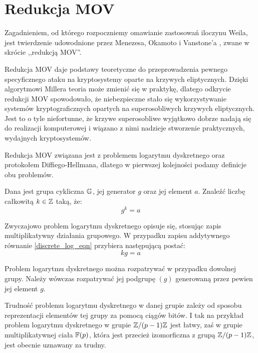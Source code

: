 \section{Redukcja MOV}

\noindent
Zagadnieniem, od którego rozpoczniemy omawianie zastosowań iloczynu Weila,
jest twierdzenie
udowodnione przez Menezesa, Okamoto i Vanstone'a \cite{menezesokamotovanstone},
zwane w skrócie ,,redukcją MOV''.

\noindent
Redukcja MOV daje podstawy teoretyczne
do przeprowadzenia pewnego specyficznego ataku
na kryptosystemy oparte na krzywych eliptycznych.
Dzięki algorytmowi Millera teoria może zmienić się w praktykę,
dlatego odkrycie redukcji MOV spowodowało,
że niebezpieczne stało się wykorzystywanie systemów kryptograficznych
opartych na superosobliwych krzywych eliptycznych.
Jest to o tyle niefortunne,
że krzywe superosobliwe wyjątkowo dobrze nadają się do
realizacji komputerowej
i wiązano z nimi nadzieje stworzenie praktycznych, wydajnych kryptosystemów.

\noindent
Redukcja MOV związana jest
z problemem logarytmu dyskretnego oraz protokołem Diff\-iego-Hell\-mana,
dlatego w pierwszej kolejności podamy definicje obu problemów.

\begin{problem}
Dana jest grupa cykliczna $\mathbb{G}$,
jej generator $g$
oraz jej element $a$.
Znaleźć liczbę całkowitą $k \in \mathbb{Z}$ taką, że:
\begin{equation}\label{discrete_log_eqn}
g^k = a
\end{equation}
\end{problem}

\begin{remark}
Zwyczajowo problem logarytmu dyskretnego opisuje się,
stosując zapis multiplikatywny działania grupowego.
W przypadku zapisu addytywnego równanie \ref{discrete_log_eqn}
przybiera następującą postać:
\begin{equation}\label{discrete_log_additive_eqn}
kg = a
\end{equation}
\end{remark}

\begin{remark}
Problem logarytmu dyskretnego można rozpatrywać w przypadku dowolnej grupy.
Należy wówczas rozpatrywać jej podgrupę $(g)$
generowaną przez pewien jej element $g$.
\end{remark}

\begin{remark}
Trudność problemu logarytmu dyskretnego w danej grupie
zależy od sposobu reprezentacji elementów tej grupy
za pomocą ciągów bitów.
I tak na przykład problem logarytmu dyskretnego w grupie $\mathbb{Z} / (p-1)\mathbb{Z}$
jest łatwy,
zaś w grupie multiplikatywnej ciała $\mathbb{F}(p)$,
która jest przecież izomorficzna z grupą $\mathbb{Z} / (p-1)\mathbb{Z}$,
jest obecnie uznawany za trudny.
\end{remark}


